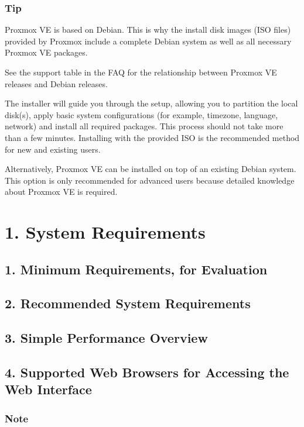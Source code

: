 \subsubsection{Tip}

Proxmox VE is based on Debian. This is why the install disk images (ISO files) provided by Proxmox include a complete Debian system as well as all necessary Proxmox VE packages.

See the support table in the FAQ for the relationship between Proxmox VE releases and Debian releases.

The installer will guide you through the setup, allowing you to partition the local disk(s), apply basic system configurations (for example, timezone, language, network) and install all required packages. This process should not take more than a few minutes. Installing with the provided ISO is the recommended method for new and existing users.

Alternatively, Proxmox VE can be installed on top of an existing Debian system. This option is only recommended for advanced users because detailed knowledge about Proxmox VE is required.


\section{1. System Requirements}

\subsection{1. Minimum Requirements, for Evaluation}

\subsection{2. Recommended System Requirements}

\subsection{3. Simple Performance Overview}

\subsection{4. Supported Web Browsers for Accessing the Web Interface}

\subsubsection{Note}

